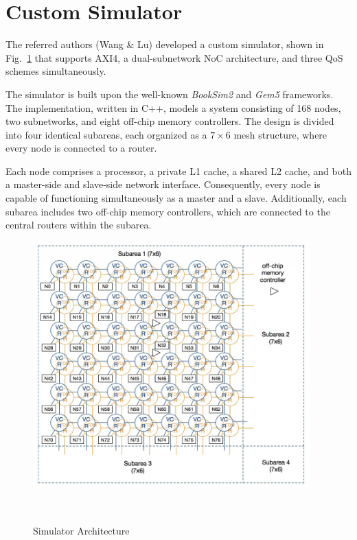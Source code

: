 \section{Custom Simulator}
The referred authors (Wang \& Lu) developed a custom simulator, shown in Fig.~\ref{fig:simulator_architecture} that supports AXI4, a dual-subnetwork NoC architecture, and three QoS schemes simultaneously.

The simulator is built upon the well-known \textit{BookSim2}\cite{jiang_detailed_2013} and \textit{Gem5}\cite{gem5_gem5_nodate} frameworks.
The implementation, written in C++, models a system consisting of 168 nodes, two subnetworks, and eight off-chip memory controllers. The design is divided into four identical subareas, each organized as a $7 \times 6$ mesh structure, where every node is connected to a router.

Each node comprises a processor, a private L1 cache, a shared L2 cache, and both a master-side and slave-side network interface. Consequently, every node is capable of functioning simultaneously as a master and a slave. Additionally, each subarea includes two off-chip memory controllers, which are connected to the central routers within the subarea.

\begin{figure}[htbp]
    \centering
    \includegraphics[width=0.95\textwidth]{img/Simulator_Architecture.png}
    \caption{Simulator Architecture}~\cite{abderazek_multicore_2013}\label{fig:simulator_architecture}
\end{figure}

